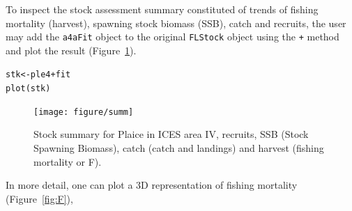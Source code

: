 \documentclass[a4paper,english,10pt]{article}\usepackage[]{graphicx}\usepackage[]{color}
\makeatletter
\newcommand{\hlopt}[1]{\textcolor[rgb]{0.2,0.2,0.2}{#1}}%
\newcommand{\hlstd}[1]{\textcolor[rgb]{0,0,0}{#1}}%
\newcommand{\hlkwb}[1]{\textcolor[rgb]{0.361,0.506,0.596}{#1}}%
\newcommand{\hlkwd}[1]{\textcolor[rgb]{0.361,0.506,0.596}{#1}}%
\newenvironment{kframe}{%
 \def\at@end@of@kframe{}%
 \ifinner\ifhmode%
  \def\at@end@of@kframe{\end{minipage}}%
  \begin{minipage}{\columnwidth}%
 \fi\fi%
 \def\FrameCommand##1{\hskip\@totalleftmargin \hskip-\fboxsep
 \colorbox{shadecolor}{##1}\hskip-\fboxsep
     \hskip-\linewidth \hskip-\@totalleftmargin \hskip\columnwidth}%
 \MakeFramed {\advance\hsize-\width
   \@totalleftmargin\z@ \linewidth\hsize
   \@setminipage}}%
 {\par\unskip\endMakeFramed%
 \at@end@of@kframe}
\newenvironment{knitrout}{}{} %
\newcommand{\code}[1]{{\texttt{#1}}}
\makeatother
\begin{document}
To inspect the stock assessment summary constituted of trends of fishing mortality (harvest), spawning stock biomass (SSB), catch and recruits, the user may add the \code{a4aFit} object to the original \code{FLStock} object using the \code{+} method and plot the result (Figure~\ref{fig:summ}).

\begin{knitrout}
\color{fgcolor}\begin{kframe}
\begin{alltt}
\hlstd{stk} \hlkwb{<-} \hlstd{ple4} \hlopt{+} \hlstd{fit}
\hlkwd{plot}\hlstd{(stk)}
\end{alltt}
\end{kframe}\begin{figure}[H]


{\centering \texttt{[image: figure/summ]} 

}

\caption[Stock summary for Plaice in ICES area IV, recruits, SSB (Stock Spawning Biomass), catch (catch and landings) and harvest (fishing mortality or F)]{Stock summary for Plaice in ICES area IV, recruits, SSB (Stock Spawning Biomass), catch (catch and landings) and harvest (fishing mortality or F).\label{fig:summ}}
\end{figure}


\end{knitrout}

In more detail, one can plot a 3D representation of fishing mortality (Figure~\ref{fig:F}),
\end{document}
